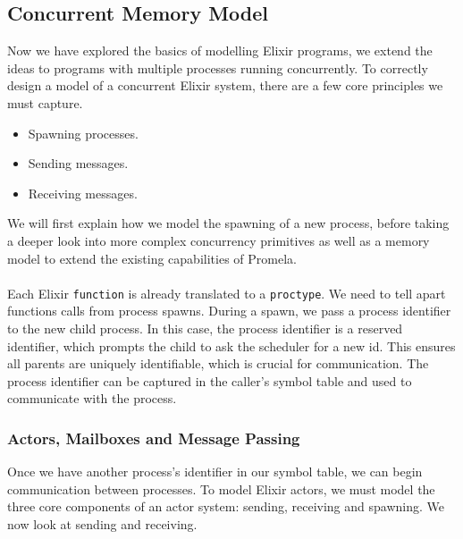 \subsection{Concurrent Memory Model} \label{sec:memory_model}
Now we have explored the basics of modelling Elixir programs, we extend the ideas to programs with multiple processes running concurrently. To correctly design a model of a concurrent Elixir system, there are a few core principles we must capture.
\begin{itemize}
    \item Spawning processes.
    \item Sending messages.
    \item Receiving messages.
\end{itemize}
We will first explain how we model the spawning of a new process, before taking a deeper look into more complex concurrency primitives as well as a memory model to extend the existing capabilities of Promela. 
\\ \\
Each Elixir \texttt{function} is already translated to a \texttt{proctype}. We need to tell apart functions calls from process spawns. During a spawn, we pass a process identifier to the new child process. In this case, the process identifier is a reserved identifier, which prompts the child to ask the scheduler for a new id. This ensures all parents are uniquely identifiable, which is crucial for communication. The process identifier can be captured in the caller's symbol table and used to communicate with the process.
\subsubsection{Actors, Mailboxes and Message Passing}
Once we have another process's identifier in our symbol table, we can begin communication between processes. To model Elixir actors, we must model the three core components of an actor system: sending, receiving and spawning. We now look at sending and receiving.
\\ \\

